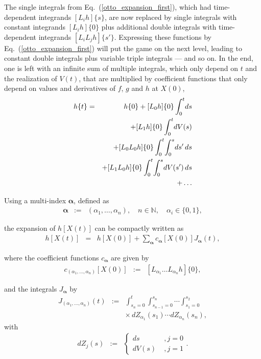 \documentclass[aps,twocolumn,superscriptaddress,showpacs,showkeys]{revtex4}
\newcommand{\vecalpha}{{\boldsymbol{\alpha}}}
\begin{document}
\noindent The single integrals from Eq.~(\ref{otto_expansion_first}), which had time-dependent integrands
$[L_ih]\{s\}$, are now replaced by single integrals with constant integrands $[L_ih]\{0\}$ plus additional double integrals
with time-dependent integrands $[L_iL_jh]\{s'\}$. Expressing these functions by Eq.~(\ref{otto_expansion_first}) will put
the game on the next level, leading to constant double integrals plus variable triple integrals --- and so on. In
the end, one is left with an infinite sum of multiple integrals, which only depend on $t$ and the realization of $V(t)$,
that are multiplied by coefficient functions that only depend on values and derivatives of $f$, $g$ and $h$ at $X(0)$,
%
\begin{eqnarray}
h\{t\} &=& h\{0\} +[L_0 h]\{0\}\int_0^t\!ds\cr
&& +[L_1 h]\{0\}\int_0^t\!dV(s)\cr
&& +[L_0L_0 h]\{0\}\int_0^t\!\int_0^s\!ds'\,ds \cr
&& +[L_1L_0 h]\{0\}\int_0^t\!\int_0^s\!dV(s')\,ds\cr
&& +\ldots
\end{eqnarray}

\noindent Using a multi-index $\vecalpha$, defined as
%
\begin{eqnarray}
\vecalpha &:=& (\alpha_1,\ldots,\alpha_n),\quad n\in{\mathbb N},\quad
\alpha_i \in \{0,1\},
\end{eqnarray}

\noindent the expansion of $h[X(t)]$ can be compactly written as
%
\begin{eqnarray}
h[X(t)] &=& h[X(0)]+\sum_\vecalpha c_\vecalpha[X(0)] J_\vecalpha(t),
\end{eqnarray}

\noindent where the coefficient functions $c_\vecalpha$ are given by
%
\begin{eqnarray}
c_{(\alpha_1,\ldots,\alpha_n)}[X(0)] &:=& [L_{\alpha_1}\ldots L_{\alpha_n} h]\{0\},
\end{eqnarray}

\noindent and the integrals $J_\vecalpha$ by
%
\begin{eqnarray}\label{def_J_alpha}
J_{(\alpha_1,\ldots,\alpha_n)}(t) &:=&
\int_{s_n=0}^{t}
\int_{s_{n\!-\!1}=0}^{s_n}\!\cdots
\int_{s_1=0}^{s_2} \nonumber\\[.3em]
&&  \times \,dZ_{\alpha_1}\!(s_1)\cdots dZ_{\alpha_n}\!(s_n) ,
\end{eqnarray}
%
\noindent with
%
\begin{eqnarray}
dZ_j(s) &:=& \left\{\begin{array}{ll}
ds    &\; , j=0 \\
dV(s) &\; , j=1
\end{array}\right. .
\end{eqnarray}
\end{document}
